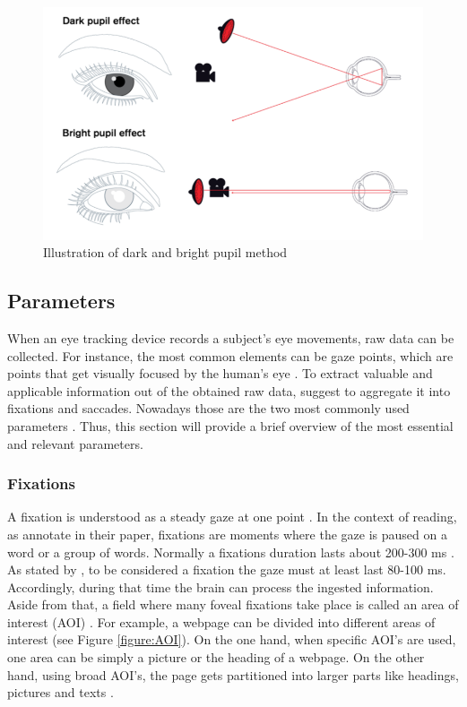 \begin{figure}[!ht]
    \centering
    \includegraphics[width=1\linewidth]{images/DarkBright.png}
    \caption{
        Illustration of dark and bright pupil method  \autocite[]{tobii2018dark}
    }
    \label{figure:DarkBright}
\end{figure}


\subsection{Parameters}
\label{subsection:Parameters}
When an eye tracking device records a subject's eye movements, raw data can be collected. For instance, the most common elements can be gaze points, which are points that get visually focused by the human's eye \autocite{bojko2009informative, vspakov2007visualization}. To extract valuable and applicable information out of the obtained raw data, \textcite[]{blascheck2014state}  suggest to aggregate it into fixations and saccades. 
Nowadays those are the two most commonly used parameters \autocite{bruneau2002eyes}. Thus, this section will provide a brief overview of the most essential and relevant parameters.

\subsubsection{Fixations}
A fixation is understood as a steady gaze at one point \autocite[]{buscher2009you}.  In the context of reading, as \textcite[]{beymer2007eye} annotate in their paper, fixations are moments where the gaze is paused on a word or a group of words. 
Normally a fixations duration lasts about 200-300 ms \autocite[]{kasneci2015online}. As stated by \textcite[]{buscher2009you}, to be considered a fixation the gaze must at least last 80-100 ms. Accordingly, during that time the brain can process the ingested information. Aside from that, a field where many foveal fixations take place is called an area of interest (AOI) \autocite[]{djamasbi2014eye}. For example, a webpage can be divided into different areas of interest (see Figure \ref{figure:AOI}).  On the one hand, when specific AOI's are used, one area can be simply a picture or the heading of a webpage. On the other hand, using broad AOI's, the page gets partitioned into larger parts like headings, pictures and texts \autocite{djamasbi2014eye}. 

